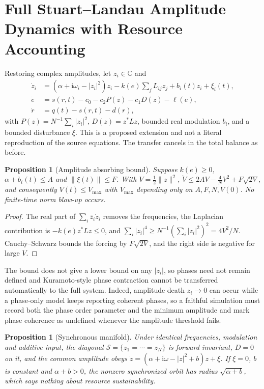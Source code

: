\documentclass[11pt,notitlepage]{report}
\newtheorem{proposition}[theorem]{Proposition}
\theoremstyle{definition}
\theoremstyle{remark}
\newcommand{\C}{\mathbb C}
\newcommand{\ii}{\mathrm i}
\begin{document}
\section{Full Stuart--Landau Amplitude Dynamics with Resource Accounting}
Restoring complex amplitudes, let $z_i\in\C$ and
\begin{align}
\dot z_i&=(\alpha+\ii\omega_i-|z_i|^2)z_i-k(e)\sum_jL_{ij}z_j+b_i(t)z_i+\xi_i(t),\label{eq:SLfull}\\
\dot e&=s(r,t)-c_0-c_2P(z)-c_1D(z)-\ell(e),\label{eq:SLenergy}\\
\dot r&=q(t)-s(r,t)-d(r),\label{eq:SLres}
\end{align}
with $P(z)=N^{-1}\sum_i|z_i|^2$, $D(z)=z^*Lz$, bounded real modulation $b_i$, and a bounded disturbance $\xi$. This is a proposed extension and not a literal reproduction of the source equations. The transfer cancels in the total balance as before.
\begin{proposition}[Amplitude absorbing bound]\label{prop:amplitude}
Suppose $k(e)\ge0$, $\alpha+b_i(t)\le A$ and $\|\xi(t)\|\le F$. With $V=\tfrac12\|z\|^2$,
$\dot V\le2AV-\tfrac4NV^2+F\sqrt{2V}$, and consequently $V(t)\le V_{\max}$ with $V_{\max}$ depending only on $A,F,N,V(0)$. No finite-time norm blow-up occurs.
\end{proposition}
\begin{proof}
The real part of $\sum_i\bar z_i\dot z_i$ removes the frequencies, the Laplacian contribution is $-k(e)z^*Lz\le0$, and $\sum_i|z_i|^4\ge N^{-1}(\sum_i|z_i|^2)^2=4V^2/N$. Cauchy--Schwarz bounds the forcing by $F\sqrt{2V}$, and the right side is negative for large $V$.
\end{proof}
The bound does not give a lower bound on any $|z_i|$, so phases need not remain defined and Kuramoto-style phase contraction cannot be transferred automatically to the full system. Indeed, amplitude death $z_i\to0$ can occur while a phase-only model keeps reporting coherent phases, so a faithful simulation must record both the phase order parameter and the minimum amplitude and mark phase coherence as undefined whenever the amplitude threshold fails.
\begin{proposition}[Synchronous manifold]\label{prop:diagonal}
Under identical frequencies, modulation and additive input, the diagonal $\mathcal S=\{z_1=\cdots=z_N\}$ is forward invariant, $D=0$ on it, and the common amplitude obeys $\dot z=(\alpha+\ii\omega-|z|^2+b)z+\xi$. If $\xi=0$, $b$ is constant and $\alpha+b>0$, the nonzero synchronized orbit has radius $\sqrt{\alpha+b}$, which says nothing about resource sustainability.
\end{proposition}
\end{document}
